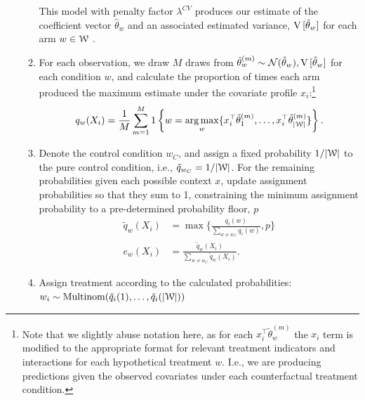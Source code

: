 \documentclass[letterpaper, 12pt, parskip=full,]{scrartcl}
\begin{document}
\begin{enumerate}
\begin{enumerate}
  
 This model with penalty factor $\lambda^{CV}$ produces our estimate of the coefficient vector $\hat \theta_w$ and an associated estimated variance, ${\textrm V}\,[\hat\theta_{w}] $ for each arm $w\in {\EuScript W}$ . 

 \item For each observation, we draw $M$ draws from $\tilde \theta ^{(m)}_w \sim \mathcal{N}(\hat \theta_w),{\textrm V}\,[\hat\theta_{w}]$ for each condition $w$, and calculate the proportion of times each arm produced the maximum estimate under the covariate profile $x_i$:\footnote{Note that we slightly abuse notation here, as for each $ x_i^\top \tilde \theta ^{(m)}_w$ the $x_i$ term is modified to the appropriate format for relevant treatment indicators and interactions for each hypothetical treatment $w$. I.e., we are producing predictions given the observed covariates under each counterfactual treatment condition. }
				\begin{align}
    q_w(X_i) = \frac{1}{M} \sum_{m=1}^M 1\left\{ w = \operatorname*{arg\,max}_w \{ x_i^\top \tilde \theta ^{(m)}_1, \dots, x_i^\top\tilde \theta_{|{\EuScript W}|}^{(m)} \}  \right\}.
				\end{align}
\item Denote the control condition $w_{C}$, and assign a fixed probability $1/|{\EuScript W}|$ to the pure control condition, i.e., $\tilde{q}_{w_C} = 1/|{\EuScript W}|$. For the remaining probabilities given each possible context $x$, update assignment probabilities so that they sum to 1, constraining the minimum assignment probability to a pre-determined probability floor, $p$
      \begin{align}
          \tilde{q}_w(X_i) & =\max\Biggr\{\frac{ q_{i}(w)}{\sum\limits_{w \neq w_{C}}q_{i}(w) } , p\Biggr\} \\
          e_{w}(X_i) & = \frac{ \tilde{q}_w(X_i)}{\sum\limits_{w \neq w_{C}}\tilde{q}_w(X_i) }. 
      \end{align}
\item Assign treatment  according to the calculated probabilities: $w_i \sim \textrm{Multinom}(\tilde{q}_{i}(1), \dots, \tilde{q}_{i}(|{\EuScript W}|))$
\end{enumerate}


\end{enumerate}
\end{document}
